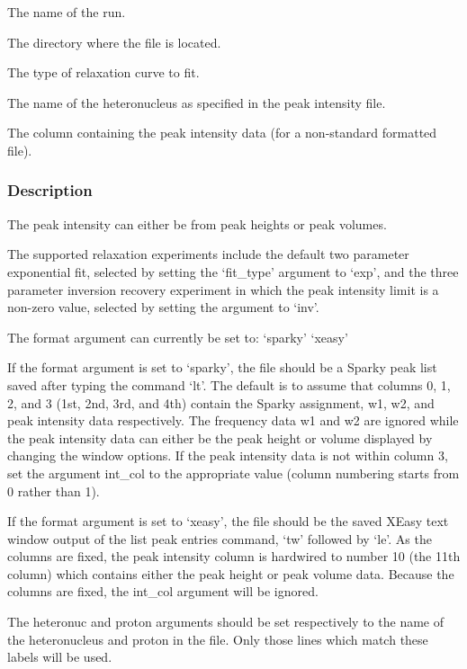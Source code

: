   The name of the run.

  The directory where the file is located.

  The type of relaxation curve to fit.

  The name of the heteronucleus as specified in the peak intensity file.

  The column containing the peak intensity data (for a non-standard formatted file).

\subsubsection{Description}

The peak intensity can either be from peak heights or peak volumes.


The supported relaxation experiments include the default two parameter exponential fit,
selected by setting the `fit\_type' argument to `exp', and the three parameter inversion
recovery experiment in which the peak intensity limit is a non-zero value, selected by
setting the argument to `inv'.


The format argument can currently be set to:
    `sparky'
    `xeasy'

If the format argument is set to `sparky', the file should be a Sparky peak list saved after
typing the command `lt'.  The default is to assume that columns 0, 1, 2, and 3 (1st, 2nd,
3rd, and 4th) contain the Sparky assignment, w1, w2, and peak intensity data respectively.
The frequency data w1 and w2 are ignored while the peak intensity data can either be the
peak height or volume displayed by changing the window options.  If the peak intensity data
is not within column 3, set the argument int\_col to the appropriate value (column numbering
starts from 0 rather than 1).

If the format argument is set to `xeasy', the file should be the saved XEasy text window
output of the list peak entries command, `tw' followed by `le'.  As the columns are fixed,
the peak intensity column is hardwired to number 10 (the 11th column) which contains either
the peak height or peak volume data.  Because the columns are fixed, the int\_col argument
will be ignored.


The heteronuc and proton arguments should be set respectively to the name of the
heteronucleus and proton in the file.  Only those lines which match these labels will be
used.


